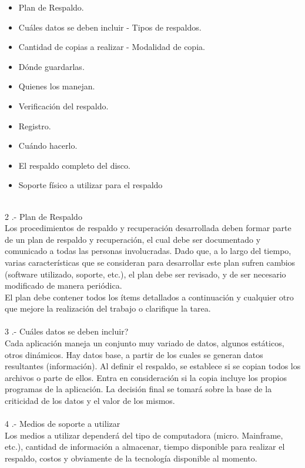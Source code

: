 \begin{itemize}
\item Plan de Respaldo.
\item Cuáles datos se deben incluir - Tipos de respaldos.
\item Cantidad de copias a realizar - Modalidad de copia.
\item Dónde guardarlas.
\item Quienes los manejan.
\item Verificación del respaldo.
\item Registro.
\item Cuándo hacerlo.
\item El respaldo completo del disco.
\item Soporte físico a utilizar para el respaldo 
\end{itemize}
\\
2 .- Plan de Respaldo  
\\
Los procedimientos de respaldo y recuperación desarrollada deben formar parte de un plan de respaldo y recuperación, el cual debe ser documentado y comunicado a todas las personas involucradas. Dado que, a lo largo del tiempo, varias características que se consideran para desarrollar este plan sufren cambios (software utilizado, soporte,
etc.), el plan debe ser revisado, y de ser necesario modificado de manera periódica. 
\\
El plan debe contener todos los ítems detallados a continuación y cualquier otro que mejore la realización del trabajo o clarifique la tarea. 
\\ \\
3 .- Cuáles datos se deben incluir? 
 \\
Cada aplicación maneja un conjunto muy variado de datos, algunos estáticos, otros dinámicos. Hay datos base, a partir de los cuales se generan datos resultantes (información). Al definir el respaldo, se establece si se copian todos los archivos o parte de ellos. Entra en consideración si la copia incluye los propios programas de la aplicación. La decisión final se tomará sobre la base de la criticidad de los datos y el valor de los mismos.  
\\
\\
4 .- Medios de soporte a utilizar 
\\
 Los medios a utilizar dependerá del tipo de computadora (micro. Mainframe, etc.), cantidad de información a almacenar, tiempo disponible para realizar el respaldo, costos y obviamente de la tecnología disponible al momento. \\
